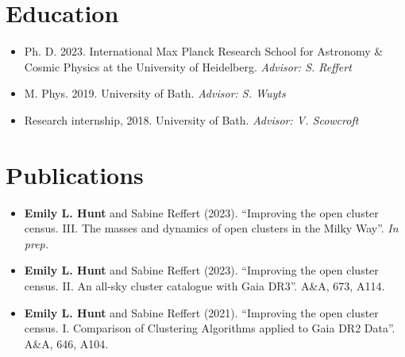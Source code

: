 \documentclass[12pt, letterpaper]{hunt-cv}
\begin{document}
\thispagestyle{plain}  %

\cvTitle




\section*{Education}

\begin{itemize}
    \item Ph. D. 2023. International Max Planck Research School for Astronomy \& Cosmic Physics at the University of Heidelberg. \emph{Advisor: S. Reffert}
    \item M. Phys. 2019. University of Bath. \emph{Advisor: S. Wuyts}
    \item Research internship, 2018. University of Bath. \emph{Advisor: V. Scowcroft}
\end{itemize}


\section*{Publications}

\begin{itemize}
    \item \textbf{Emily L. Hunt} and Sabine Reffert (2023). ``Improving the open cluster census. III. The masses and dynamics of open clusters in the Milky Way''. \emph{In prep.}
    \item \textbf{Emily L. Hunt} and Sabine Reffert (2023). ``Improving the open cluster census. II. An all-sky cluster catalogue with Gaia DR3''. A\&A, 673, A114.
    \item \textbf{Emily L. Hunt} and Sabine Reffert (2021). ``Improving the open cluster census. I. Comparison of Clustering Algorithms applied to Gaia DR2 Data''. A\&A, 646, A104.
\end{itemize}
\end{document}
